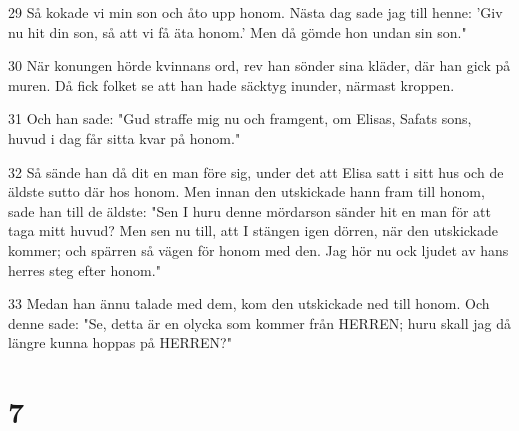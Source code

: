 \par 29 Så kokade vi min son och åto upp honom. Nästa dag sade jag till henne: 'Giv nu hit din son, så att vi få äta honom.' Men då gömde hon undan sin son."
\par 30 När konungen hörde kvinnans ord, rev han sönder sina kläder, där han gick på muren. Då fick folket se att han hade säcktyg inunder, närmast kroppen.
\par 31 Och han sade: "Gud straffe mig nu och framgent, om Elisas, Safats sons, huvud i dag får sitta kvar på honom."
\par 32 Så sände han då dit en man före sig, under det att Elisa satt i sitt hus och de äldste sutto där hos honom. Men innan den utskickade hann fram till honom, sade han till de äldste: "Sen I huru denne mördarson sänder hit en man för att taga mitt huvud? Men sen nu till, att I stängen igen dörren, när den utskickade kommer; och spärren så vägen för honom med den. Jag hör nu ock ljudet av hans herres steg efter honom."
\par 33 Medan han ännu talade med dem, kom den utskickade ned till honom. Och denne sade: "Se, detta är en olycka som kommer från HERREN; huru skall jag då längre kunna hoppas på HERREN?"

\chapter{7}

